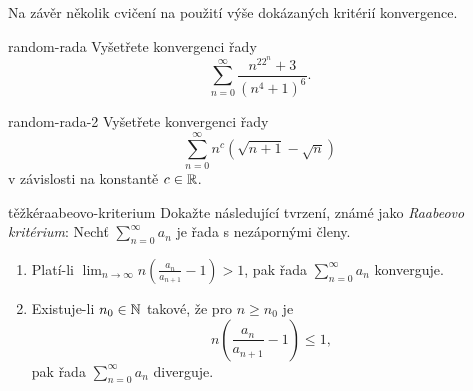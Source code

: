 Na závěr několik cvičení na použití výše dokázaných kritérií konvergence.

\begin{exercise}{}{random-rada}
 Vyšetřete konvergenci řady
 \[
  \sum_{n=0}^{\infty} \frac{n^22^{n}+3}{(n^{4}+1)^{6}}.
 \]
\end{exercise}
\begin{exercise}{}{random-rada-2}
 Vyšetřete konvergenci řady
 \[
  \sum_{n = 0}^{\infty} n^{c}(\sqrt{n+1}-\sqrt{n})
 \]
 v závislosti na konstantě $c \in \mathbb{R}$.
\end{exercise}
\begin{exercise}{těžké}{raabeovo-kriterium}
 Dokažte následující tvrzení, známé jako \emph{Raabeovo kritérium}: Nechť
 $\sum_{n = 0}^{\infty} a_n$ je řada s nezápornými členy.
 \begin{enumerate}[label=(\alph*)]
  \item Platí-li $\lim_{n \to \infty} n \left( \frac{a_n}{a_{n+1}} - 1 \right) >
   1$, pak řada $\sum_{n = 0}^{\infty} a_n$ konverguje.
  \item Existuje-li $n_0 \in \mathbb{N}$ takové, že pro $n \geq n_0$ je
  \[
   n \left( \frac{a_n}{a_{n+1}} - 1 \right) \leq 1,
  \]
  pak řada $\sum_{n = 0}^{\infty} a_n$ diverguje.
 \end{enumerate}
\end{exercise}
